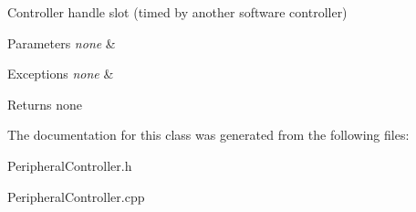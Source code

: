 Controller handle slot (timed by another software controller) 


\begin{DoxyParams}{Parameters}
{\em none} & \\
\hline
\end{DoxyParams}

\begin{DoxyExceptions}{Exceptions}
{\em none} & \\
\hline
\end{DoxyExceptions}
\begin{DoxyReturn}{Returns}
none 
\end{DoxyReturn}


The documentation for this class was generated from the following files\-:\begin{DoxyCompactItemize}
\item 
Peripheral\-Controller.\-h\item 
Peripheral\-Controller.\-cpp\end{DoxyCompactItemize}
